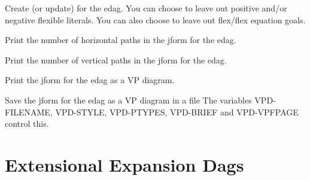 \begin{description} 
\item[CJFORM]  
Create (or update) for the edag.  You can choose to
leave out positive and/or negative flexible literals.
You can also choose to leave out flex/flex equation goals.

\item[NUM-HPATHS]  
Print the number of horizontal paths in the jform for the edag.

\item[NUM-VPATHS]  
Print the number of vertical paths in the jform for the edag.

\item[VP]  
Print the jform for the edag as a VP diagram.

\item[VPD]  
Save the jform for the edag as a VP diagram in a file
The variables VPD-FILENAME, VPD-STYLE, VPD-PTYPES, VPD-BRIEF and VPD-VPFPAGE
control this.
\item
\end{description}

\section{Extensional Expansion Dags}

